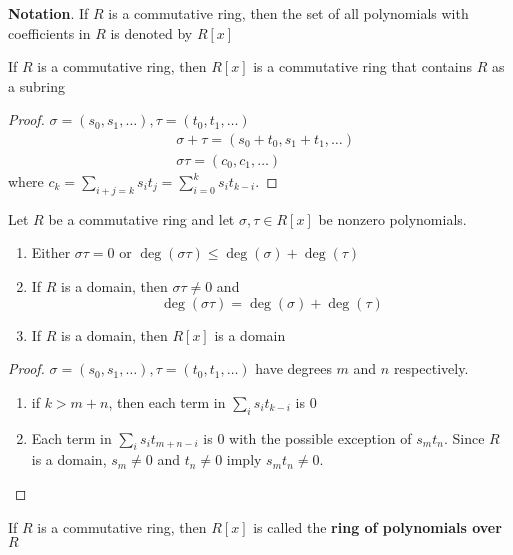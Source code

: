 \documentclass[11pt]{article}
\begin{document}
\textbf{Notation}. If \(R\) is a commutative ring, then the set of all polynomials with
coefficients in \(R\) is denoted by \(R[x]\)


\begin{proposition}[]
\label{prop3.14}
If \(R\) is a commutative ring, then \(R[x]\) is a commutative ring that contains
\(R\) as a subring
\end{proposition}

\begin{proof}
\(\sigma=(s_0,s_1,\dots),\tau=(t_0,t_1,\dots)\)
\begin{align*}
&\sigma+\tau=(s_0+t_0,s_1+t_1,\dots)\\
&\sigma\tau=(c_0,c_1,\dots)
\end{align*}
where \(c_k=\sum_{i+j=k}s_it_j=\sum_{i=0}^ks_it_{k-i}\).
\end{proof}

\begin{lemma}[]
\label{lemma3.15}
Let \(R\) be a commutative ring and let \(\sigma,\tau\in R[x]\) be nonzero
polynomials.
\begin{enumerate}
\item Either \(\sigma\tau=0\) or \(\deg(\sigma\tau)\le\deg(\sigma)+\deg(\tau)\)
\item If \(R\) is a domain, then \(\sigma\tau\neq0\) and 
\begin{equation*}
\deg(\sigma\tau)=\deg(\sigma)+\deg(\tau)
\end{equation*}
\item If \(R\) is a domain, then \(R[x]\) is a domain
\end{enumerate}
\end{lemma}

\begin{proof}
\(\sigma=(s_0,s_1,\dots),\tau=(t_0,t_1,\dots)\) have degrees \(m\) and \(n\) respectively.
\begin{enumerate}
\item if \(k>m+n\), then each term in \(\sum_is_it_{k-i}\) is 0
\item Each term in \(\sum_is_it_{m+n-i}\) is 0 with the possible exception of
\(s_mt_n\). Since \(R\) is a domain, \(s_m\neq 0\) and \(t_n\neq0\) imply \(s_mt_n\neq0\).
\end{enumerate}
\end{proof}

\begin{definition}[]
If \(R\) is a commutative ring, then \(R[x]\) is called the \textbf{ring of polynomials
over \(R\)}
\end{definition}
\end{document}
